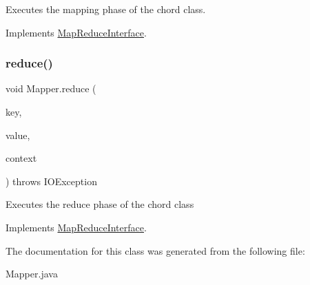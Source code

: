 Executes the mapping phase of the chord class. 

Implements \mbox{\hyperlink{interface_map_reduce_interface}{Map\+Reduce\+Interface}}.

\mbox{\label{class_mapper_a5c6a53e9cd1419e4b5eded401331c2fd}} 
\subsubsection{\texorpdfstring{reduce()}{reduce()}}
{\footnotesize\ttfamily void Mapper.\+reduce (\begin{DoxyParamCaption}\item[{Long}]{key,  }\item[{List$<$ String $>$}]{value,  }\item[{\mbox{\hyperlink{interface_chord_message_interface}{Chord\+Message\+Interface}}}]{context }\end{DoxyParamCaption}) throws I\+O\+Exception\hspace{0.3cm}{\ttfamily [inline]}}

Executes the reduce phase of the chord class 

Implements \mbox{\hyperlink{interface_map_reduce_interface}{Map\+Reduce\+Interface}}.



The documentation for this class was generated from the following file\+:\begin{DoxyCompactItemize}
\item 
Mapper.\+java\end{DoxyCompactItemize}
